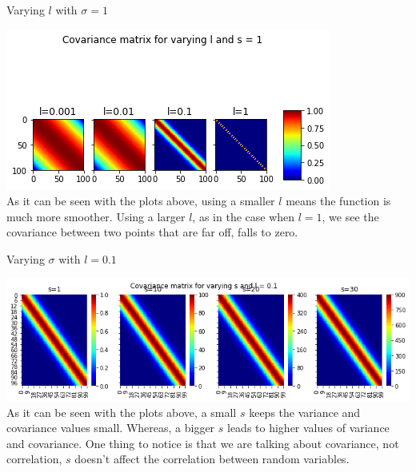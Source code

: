 \documentclass{beamer}
\begin{document}
	\begin{frame}{Varying $l$ with $\sigma = 1$}
		\begin{center}
			\includegraphics[width=\linewidth, height=\textheight -120pt ,keepaspectratio]{gp/vary_l}\\
			As it can be seen with the plots above, using a smaller $l$ means the function is much more smoother. Using a larger $l$, as in the case when $l = 1$, we see the covariance between two points that are far off, falls to zero.
		\end{center}
		
	\end{frame}
	
	\begin{frame}{Varying $\sigma$ with $l = 0.1$}
		\begin{center}
			\includegraphics[width=\linewidth, height=\textheight -120pt ,keepaspectratio]{gp/vary_s}\\
			As it can be seen with the plots above, a small $s$ keeps the variance and covariance values small. Whereas, a bigger $s$ leads to higher values of variance and covariance. One thing to notice is that we are talking about covariance, not correlation, $s$ doesn't affect the correlation between random variables.
		\end{center}
	\end{frame}
	
\end{document}
